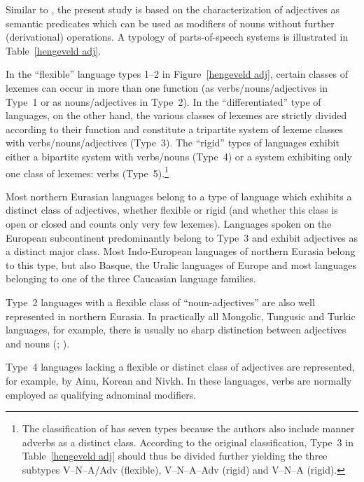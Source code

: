 Similar to \citet{hengeveld-etal2004}, the present study is based on the characterization of adjectives as semantic predicates which can be used as modifiers of nouns without further (derivational) operations. A typology of parts-of-speech systems is illustrated in Table~\ref{hengeveld adj}.

In the “flexible” language types 1–2 in Figure~\ref{hengeveld adj}, certain classes of lexemes can occur in more than one function (as verbs/nouns/adjectives in Type~1 or as nouns/adjectives in Type~2). In the “differentiated” type of languages, on the other hand, the various classes of lexemes are strictly divided according to their function and constitute a tripartite system of lexeme classes with verbs\fshyp{}nouns\fshyp{}adjectives (Type~3). The “rigid” types of languages exhibit either a bipartite system with verbs/nouns (Type~4) or a system exhibiting only one class of lexemes: verbs (Type~5).\footnote{The classification of \citet{hengeveld-etal2004} has seven types because the authors also include manner adverbs as a distinct class. According to the original classification, Type~3 in Table~\ref{hengeveld adj} should thus be divided further yielding the three subtypes V–N–A/Adv (flexible), V–N–A–Adv (rigid) and V–N–A (rigid).} 

Most northern Eurasian languages belong to a type of language which exhibits a distinct class of adjectives, whether flexible or rigid (and whether this class is open or closed and counts only very few lexemes). Languages spoken on the European subcontinent predominantly belong to Type~3 and exhibit adjectives as a distinct major class. Most Indo-European languages of northern Eurasia belong to this type, but also Basque, the Uralic languages of Europe and most languages belonging to one of the three Caucasian language families.

Type~2 languages with a flexible class of “noun-adjectives” are also well represented in northern Eurasia. In practically all Mongolic, Tungusic and Turkic languages, for example, there is usually no sharp distinction between adjectives and nouns (\citealt[122–123]{rijkhoff2002}; \citealt[9]{poppe1964}).

Type~4 languages lacking a flexible or distinct class of adjectives are represented, for example, by Ainu, Korean and Nivkh. In these languages, verbs are normally employed as qualifying adnominal modifiers.

